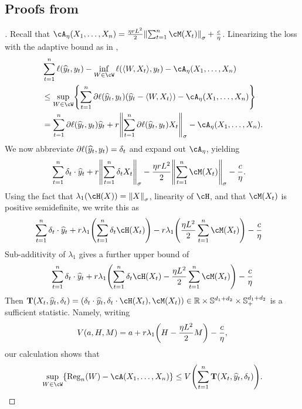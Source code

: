 

\subsection{Proofs from }



\begin{proof}[]

  Recall that $\cA_{\eta}(X_{1},\ldots,X_{n}) = \frac{\eta{}rL^{2}}{2}\nrm*{\sum_{t=1}^{n}\cM(X_t)}_{\sigma} + \frac{c}{\eta}$. Linearizing the loss with the adaptive bound as in , 
\begin{align*}
	&\sum_{t=1}^{n}\ls(\pred_t, y_t) - \inf_{W\in\cW}\ls(\tri*{W,X_t}, y_t) - \cA_{\eta}(X_{1},\ldots,X_{n}) \\
    &\leq \sup_{W\in\cW}\crl*{
       \sum_{t=1}^{n}\partial\ls(\pred_t, y_t)(\pred_t - \tri*{W,X_t}) - \cA_{\eta}(X_{1},\ldots,X_{n})
      } \\
    &=
      \sum_{t=1}^{n}\partial\ls(\pred_t, y_t)\pred_t  + r\nrm*{\sum_{t=1}^{n}\partial\ls(\pred_t, y_t)X_t}_{\sigma}- \cA_{\eta}(X_{1},\ldots,X_{n}) .
  \end{align*}
	We now abbreviate $\partial\ell({\widehat{y}}_t, y_t) = \delta_{t}$ and expand out $\cA_{\eta}$, yielding
\begin{align*}
        &\sum_{t=1}^{n}\dl_t\cdot\pred_t  + r\nrm*{\sum_{t=1}^{n}\dl_tX_t}_{\sigma} - \frac{\eta{}rL^{2}}{2}\nrm*{\sum_{t=1}^{n}\cM(X_t)}_{\sigma} - \frac{c}{\eta}.
\end{align*}
Using the fact that $\lambda_{1}(\cH(X)) = \nrm*{X}_{\sigma}$, linearity of $\cH$, and that $\cM(X_t)$ is positive semidefinite, we write this as
\begin{align*}
      &\sum_{t=1}^{n}\dl_t\cdot\pred_t  + r\lambda_{1}\prn*{\sum_{t=1}^{n}\dl_t\cH(X_t)} - r\lambda_{1}\prn*{\frac{\eta{}L^2}{2}\sum_{t=1}^{n}\cM(X_t)} - \frac{c}{\eta}
\end{align*}
Sub-additivity of $\lambda_{1}$ gives a further upper bound of
\begin{align*}    
        \sum_{t=1}^{n}\dl_t\cdot\pred_t  + r\lambda_{1}\prn*{\sum_{t=1}^{n}\dl_t\cH(X_t)-\frac{\eta{}L^{2}}{2}\sum_{t=1}^{n}\cM(X_t)} - \frac{c}{\eta}
\end{align*}
Then $\suff(X_t,\pred_t,\delta_t) = \left( \delta_t\cdot\pred_t, \delta_t\cdot \cH(X_t), \cM(X_t) \right)\in\reals\times \sym^{d_1+d_2}\times \sym^{d_1+d_2}_{+}$ is a sufficient statistic. Namely, writing
\[
V(a, H, M) = a + r\lambda_1\prn*{H -\frac{\eta{L^{2}}}{2}M} - \frac{c}{\eta},
\]
our calculation shows that
\[
\sup_{W\in\cW}\crl*{\reg(W) - \cA(X_{1},\ldots,X_{n})
      }
      \leq{} V\prn*{
      \sum_{t=1}^{n}\suff(X_t,\pred_t,\delta_t)
      }.
\]
  \end{proof}

